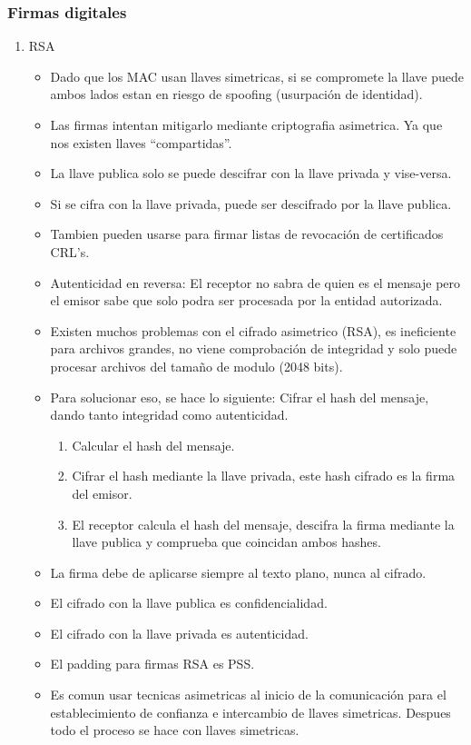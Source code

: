 \documentclass[11pt]{article}
\begin{document}
\subsubsection{Firmas digitales}
\label{sec:org8abbd1a}
\begin{enumerate}
\item RSA
\label{sec:org0323ffd}
\begin{itemize}
\item Dado que los MAC usan llaves simetricas, si se compromete la llave puede ambos lados estan en riesgo de spoofing (usurpación de identidad).
\item Las firmas intentan mitigarlo mediante criptografia asimetrica. Ya que nos existen llaves ``compartidas''.
\item La llave publica solo se puede descifrar con la llave privada y vise-versa.
\item Si se cifra con la llave privada, puede ser descifrado por la llave publica.
\item Tambien pueden usarse para firmar listas de revocación de certificados CRL's.

\item Autenticidad en reversa: El receptor no sabra de quien es el mensaje pero el emisor sabe que solo podra ser procesada por la entidad autorizada.

\item Existen muchos problemas con el cifrado asimetrico (RSA), es ineficiente para archivos grandes, no viene comprobación de integridad y solo puede procesar archivos del tamaño de modulo (2048 bits).

\item Para solucionar eso, se hace lo siguiente: Cifrar el hash del mensaje, dando tanto integridad como autenticidad.
\begin{enumerate}
\item Calcular el hash del mensaje.
\item Cifrar el hash mediante la llave privada, este hash cifrado es la firma del emisor.
\item El receptor calcula el hash del mensaje, descifra la firma mediante la llave publica y comprueba que coincidan ambos hashes.
\end{enumerate}

\item La firma debe de aplicarse siempre al texto plano, nunca al cifrado.

\item El cifrado con la llave publica es confidencialidad.
\item El cifrado con la llave privada es autenticidad.

\item El padding para firmas RSA es PSS.

\item Es comun usar tecnicas asimetricas al inicio de la comunicación para el establecimiento de confianza e intercambio de llaves simetricas. Despues todo el proceso se hace con llaves simetricas.
\end{itemize}
\end{enumerate}
\end{document}
